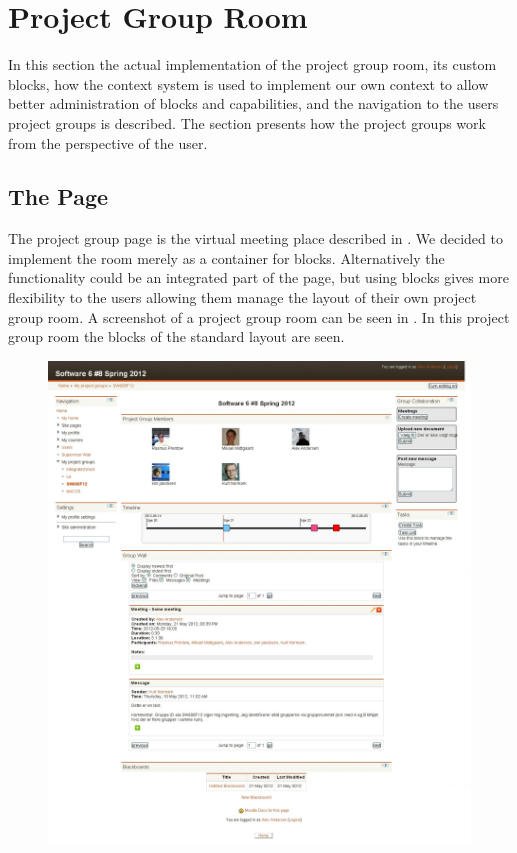 \section{Project Group Room}
\label{sec:projGroupRoomImpl}
In this section the actual implementation of the project group room, its custom blocks, how the context system is used to implement our own context to allow better administration of blocks and capabilities, and the navigation to the users project groups is described.
The section presents how the project groups work from the perspective of the user. 


\subsection{The Page}
\label{sub:page}
The project group page is the virtual meeting place described in .
We decided to implement the room merely as a container for blocks. 
Alternatively the functionality could be an integrated part of the page, but using blocks gives more flexibility to the users allowing them manage the layout of their own project group room. 
A screenshot of a project group room can be seen in . 
In this project group room the blocks of the standard layout are seen.
\begin{figure}[h]
	\centering
		\includegraphics[width=\textwidth]{images/projectgroupnoedit.png}
	\label{fig:projectgroupnoedit}
\end{figure}

